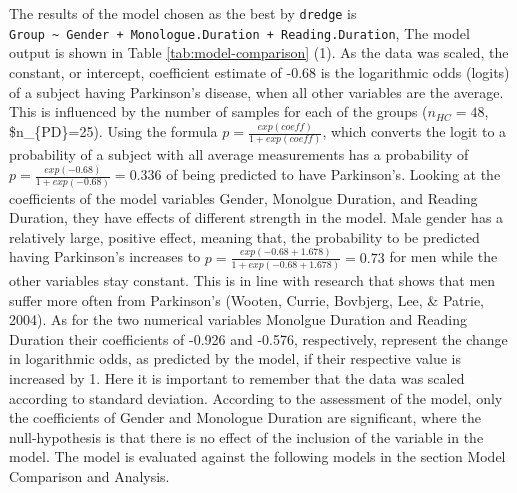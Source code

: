 \documentclass[
  english,
  doc,floatsintext]{apa6}
\newenvironment{Shaded}{\begin{snugshade}}{\end{snugshade}}
\newcommand{\AttributeTok}[1]{\textcolor[rgb]{0.77,0.63,0.00}{#1}}
\newcommand{\DecValTok}[1]{\textcolor[rgb]{0.00,0.00,0.81}{#1}}
\newcommand{\FunctionTok}[1]{\textcolor[rgb]{0.00,0.00,0.00}{#1}}
\newcommand{\NormalTok}[1]{#1}
\newcommand{\OtherTok}[1]{\textcolor[rgb]{0.56,0.35,0.01}{#1}}
\newcommand{\SpecialCharTok}[1]{\textcolor[rgb]{0.00,0.00,0.00}{#1}}
\newcommand{\StringTok}[1]{\textcolor[rgb]{0.31,0.60,0.02}{#1}}
\begin{document}
\begin{Shaded}
\end{Shaded}

The results of the model chosen as the best by \texttt{dredge} is \texttt{Group\ \textasciitilde{}\ Gender\ +\ Monologue.Duration\ +\ Reading.Duration},
The model output is shown in Table \ref{tab:model-comparison} (1). As the data was scaled, the constant, or intercept,
coefficient estimate of -0.68 is the logarithmic odds (logits) of a subject having Parkinson's disease, when all other
variables are the average. This is influenced by the number of samples for each of the groups (\(n_{HC}=48\), \$n\_\{PD\}=25).
Using the formula \(p=\frac{exp(coeff)}{1+exp(coeff)}\), which converts the logit to a probability of a subject with all
average measurements has a probability of \(p=\frac{exp(-0.68)}{1+exp(-0.68)}=0.336\) of being predicted to have Parkinson's.
Looking at the coefficients of the model variables Gender, Monolgue Duration, and
Reading Duration, they have effects of different strength in the model. Male gender has a relatively
large, positive effect, meaning that, the probability to be predicted having Parkinson's increases to
\(p=\frac{exp(-0.68 + 1.678)}{1+exp(-0.68 + 1.678)}=0.73\) for men while the other variables stay constant.
This is in line with research that shows that men suffer
more often from Parkinson's (Wooten, Currie, Bovbjerg, Lee, \& Patrie, 2004). As for the two numerical variables Monolgue
Duration and Reading Duration their coefficients of -0.926 and -0.576, respectively, represent
the change in logarithmic odds, as predicted by the model, if their respective value is increased by 1. Here it is
important to remember that the data was scaled according to standard deviation. According to the assessment of the model,
only the coefficients of Gender and Monologue Duration are significant, where the null-hypothesis is that there is no
effect of the inclusion of the variable in the model. The model is evaluated against the following models in the section
Model Comparison and Analysis.
\end{document}
